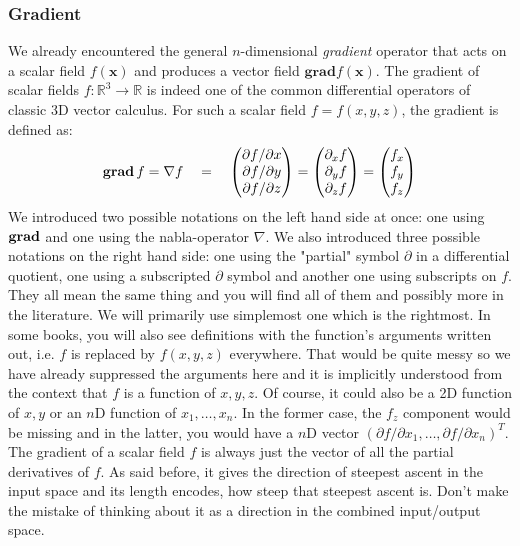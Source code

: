 \subsubsection{Gradient}
We already encountered the general $n$-dimensional \emph{gradient} operator that acts on a scalar field $f(\mathbf{x})$ and produces a vector field $\mathbf{grad} f(\mathbf{x})$. The gradient of scalar fields $f: \mathbb{R}^3 \rightarrow \mathbb{R}$ is indeed one of the common differential operators of classic 3D vector calculus. For such a scalar field $f = f(x,y,z)$, the gradient is defined as:
\begin{equation}
 \operatorname{\mathbf{grad}} f = \nabla f  \quad = \quad
 \begin{pmatrix}
  \partial f / \partial x \\
  \partial f / \partial y \\
  \partial f / \partial z
 \end{pmatrix}
 =
 \begin{pmatrix}
  \partial_x f \\
  \partial_y f \\
  \partial_z f
\end{pmatrix}
= 
 \begin{pmatrix}
   f_x \\
   f_y \\
   f_z
\end{pmatrix} 
\end{equation}
We introduced two possible notations on the left hand side at once: one using $\operatorname{\mathbf{grad}}$ and one using the nabla-operator $\nabla$. We also introduced three possible notations on the right hand side: one using the "partial" symbol $\partial$ in a differential quotient, one using a subscripted $\partial$ symbol and another one using subscripts on $f$. They all mean the same thing and you will find all of them and possibly more in the literature. We will primarily use simplemost one which is the rightmost. In some books, you will also see definitions with the function's arguments written out, i.e. $f$ is replaced by $f(x,y,z)$ everywhere. That would be quite messy so we have already suppressed the arguments here and it is implicitly understood from the context that $f$ is a function of $x,y,z$. Of course, it could also be a 2D function of $x,y$ or an $n$D function of $x_1, \ldots, x_n$. In the former case, the $f_z$ component would be missing and in the latter, you would have a $n$D vector $(\partial f / \partial x_1, \ldots, \partial f / \partial x_n)^T$. The gradient of a scalar field $f$ is always just the vector of all the partial derivatives of $f$. As said before, it gives the direction of steepest ascent in the input space and its length encodes, how steep that steepest ascent is. Don't make the mistake of thinking about it as a direction in the combined input/output space.

